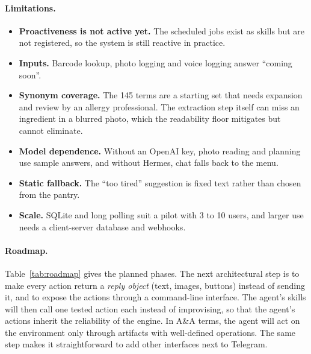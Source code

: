 \documentclass[11pt,a4paper]{article}
\begin{document}
\paragraph{Limitations.}
\begin{itemize}
  \item \textbf{Proactiveness is not active yet.} The scheduled jobs exist as skills but are not
        registered, so the system is still reactive in practice.
  \item \textbf{Inputs.} Barcode lookup, photo logging and voice logging answer ``coming soon''.
  \item \textbf{Synonym coverage.} The 145 terms are a starting set that needs expansion and review by
        an allergy professional. The extraction step itself can miss an ingredient in a blurred photo,
        which the readability floor mitigates but cannot eliminate.
  \item \textbf{Model dependence.} Without an OpenAI key, photo reading and planning use sample answers,
        and without Hermes, chat falls back to the menu.
  \item \textbf{Static fallback.} The ``too tired'' suggestion is fixed text rather than chosen from the
        pantry.
  \item \textbf{Scale.} SQLite and long polling suit a pilot with 3 to 10 users, and larger use needs a
        client-server database and webhooks.
\end{itemize}

\paragraph{Roadmap.} Table~\ref{tab:roadmap} gives the planned phases. The next architectural step is to
make every action return a \emph{reply object} (text, images, buttons) instead of sending it, and to
expose the actions through a command-line interface. The agent's skills will then call one tested action
each instead of improvising, so that the agent's actions inherit the reliability of the engine. In A\&A
terms, the agent will act on the environment only through artifacts with well-defined operations. The
same step makes it straightforward to add other interfaces next to Telegram.
\end{document}
